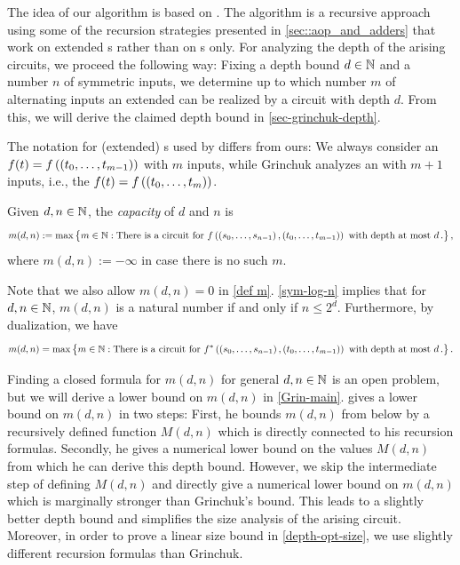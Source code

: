The idea of our algorithm is based on \citet{Grinchuk}.
The algorithm is a recursive approach using some of the recursion strategies presented 
in \cref{sec::aop_and_adders}
that work on extended \aop{}s rather than on \aop{}s only.
For analyzing the depth of the arising circuits,
we proceed the following way:
Fixing a depth bound $d \in \mathbb N$ and a number $n$ of symmetric inputs,
we determine up to which number $m$ of alternating inputs
an extended \aop{} can be realized by a circuit with depth $d$.
From this, we will derive the claimed depth bound in \cref{sec-grinchuk-depth}.

\begin{remark_no_num}
 The notation for (extended) \aop{}s used by \citet{Grinchuk} differs from ours:
 We always consider an \aop{} $f(t) = f\left({\left({t_0, \dotsc, t_{m-1}}\right)}\right)$ with $m$ inputs,
 while Grinchuk analyzes an \aop{} with $m+1$ inputs,
 i.e., the \aop{} $f(t) = f\left({\left({t_0, \dotsc, t_{m}}\right)}\right)$.
\end{remark_no_num}

\begin{definition} \label{def m}
 Given $d, n \in \mathbb N$, the \emph{capacity} of $d$ and $n$
 is
 \[
  m(d, n) := \max \big\{m \in \mathbb N :{}{} \text{There is a circuit for } f\left({\left({s_0, \dotsc, s_{n-1}}\right), \left({t_0, \dotsc, t_{m-1}}\right)}\right)
                                            \text{ with depth at most } d\,.\big\}\,,
 \]
 where $m(d, n) := - \infty$ in case there is no such $m$.
\end{definition}

Note that we also allow $m(d, n) = 0$ in \cref{def m}.
\cref{sym-log-n} implies that for $d, n \in \mathbb N$, 
$m(d, n)$ is a natural number if and only if $n \leq 2^d$.
Furthermore, by dualization, we have
\[
  m(d, n) = \max \big\{m \in \mathbb N :{}{} \text{There is a circuit for } f^*\left({\left({s_0, \dotsc, s_{n-1}}\right), \left({t_0, \dotsc, t_{m-1}}\right)}\right)
                                           \text{ with depth at most } d\,.\big\}\,.
\]



Finding a closed formula for $m(d, n)$ for general $d, n \in \mathbb N$ is an open problem,
but we will derive a lower bound on $m(d, n)$ in \cref{Grin-main}.
\citet{Grinchuk} gives a lower bound on $m(d, n)$ in two steps:
First, he bounds $m(d, n)$ from below by a recursively defined function $M(d, n)$
which is directly connected to his recursion formulas.
Secondly, he gives a numerical lower bound on the values $M(d, n)$
from which he can derive this depth bound.
However, we skip the intermediate step of defining $M(d, n)$ and directly
give a numerical lower bound on $m(d, n)$
which is marginally stronger than Grinchuk's bound.
This leads to a slightly better depth bound
and simplifies the size analysis of the arising circuit.
Moreover, in order to prove a linear size bound in \cref{depth-opt-size},
we use slightly different recursion formulas than Grinchuk.

